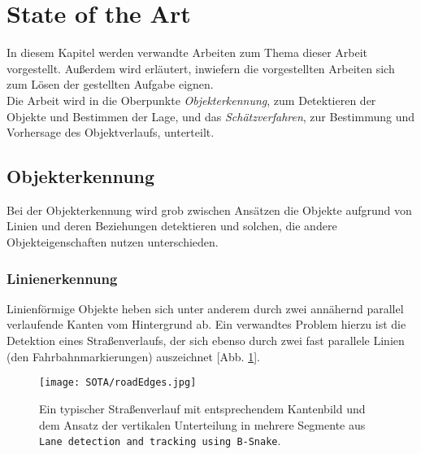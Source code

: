\cleardoublepage
\section{State of the Art}
In diesem Kapitel werden verwandte Arbeiten zum Thema dieser Arbeit vorgestellt. Außerdem wird erläutert, inwiefern die vorgestellten Arbeiten sich zum Lösen der gestellten Aufgabe eignen.\\
Die Arbeit wird in die Oberpunkte \textit{Objekterkennung}, zum Detektieren der Objekte und Bestimmen der Lage, und das \textit{Schätzverfahren}, zur Bestimmung und Vorhersage des Objektverlaufs, unterteilt.
\subsection{Objekterkennung}
Bei der Objekterkennung wird grob zwischen Ansätzen die Objekte aufgrund von Linien und deren Beziehungen detektieren und solchen, die andere Objekteigenschaften nutzen unterschieden.
\subsubsection{Linienerkennung}
Linienförmige Objekte heben sich unter anderem durch zwei annähernd parallel verlaufende Kanten vom Hintergrund ab.
Ein verwandtes Problem hierzu ist die Detektion eines Straßenverlaufs, der sich ebenso durch zwei fast parallele Linien (den Fahrbahnmarkierungen) auszeichnet [Abb. \ref{Abb. 4}].\\
\begin{figure}[H]
	\texttt{[image: SOTA/roadEdges.jpg]}
	\caption[Typischer Straßenverlauf mit entpsrechendem Kantenbild]{Ein typischer Straßenverlauf mit entsprechendem Kantenbild und dem Ansatz der vertikalen Unterteilung in mehrere Segmente aus \texttt{Lane detection and tracking using B-Snake}\cite{wang2004lane}.}
	\label{Abb. 4}
\end{figure}

